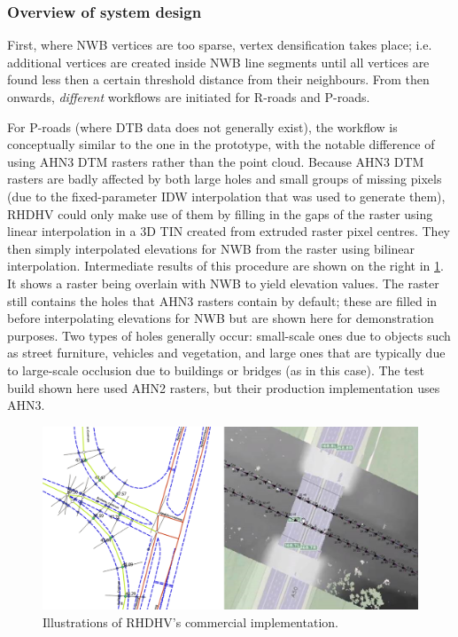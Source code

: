 \subsubsection{Overview of system design}

First, where NWB vertices are too sparse, vertex densification takes place; i.e. additional vertices are created inside NWB line segments until all vertices are found less then a certain threshold distance from their neighbours. From then onwards, \textit{different} workflows are initiated for R-roads and P-roads.

For P-roads (where DTB data does not generally exist), the workflow is conceptually similar to the one in the prototype, with the notable difference of using AHN3 DTM rasters rather than the point cloud. Because AHN3 DTM rasters are badly affected by both large holes and small groups of missing pixels (due to the fixed-parameter IDW interpolation that was used to generate them), RHDHV could only make use of them by filling in the gaps of the raster using linear interpolation in a 3D TIN created from extruded raster pixel centres. They then simply interpolated elevations for NWB from the raster using bilinear interpolation. Intermediate results of this procedure are shown on the right in \ref{fig:rhdhv}. It shows a raster being overlain with NWB to yield elevation values. The raster still contains the holes that AHN3 rasters contain by default; these are filled in before interpolating elevations for NWB but are shown here for demonstration purposes. Two types of holes generally occur: small-scale ones due to objects such as street furniture, vehicles and vegetation, and large ones that are typically due to large-scale occlusion due to buildings or bridges (as in this case). The test build shown here used AHN2 rasters, but their production implementation uses AHN3.

\begin{figure}
    \centering
    \includegraphics[width=\linewidth]{final_report/figs/rhdhv_combined.png}
    \caption{Illustrations of RHDHV's commercial implementation.}
    \label{fig:rhdhv}
\end{figure}

